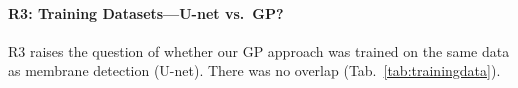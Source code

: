 \documentclass[10pt,twocolumn,letterpaper]{article}
\begin{document}
%


\paragraph{R3: Training Datasets---U-net vs.~GP?}
R3 raises the question of whether our GP approach was trained on the same data as membrane detection (U-net). There was no overlap (Tab.~\ref{tab:trainingdata}).

\vspace{-1mm}
\end{document}
